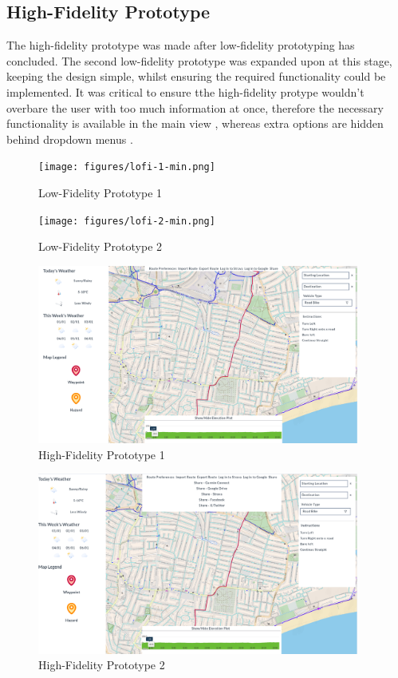 \subsection{High-Fidelity Prototype}
\label{ui:hi-fi}

The high-fidelity prototype was made after low-fidelity prototyping has concluded. The second low-fidelity prototype was expanded upon at this stage, keeping the design simple, whilst ensuring the required functionality could be implemented. It was critical to ensure tthe high-fidelity protype wouldn't overbare the user with too much information at once, therefore the necessary functionality is available in the main view , whereas extra options are hidden behind dropdown menus .

  \begin{figure}[!ht]
    \centering
    \texttt{[image: figures/lofi-1-min.png]}
    \caption{Low-Fidelity Prototype 1}
    \label{fig:lofi1}
  \end{figure}

  \begin{figure}[!ht]
    \centering
    \texttt{[image: figures/lofi-2-min.png]}
    \caption{Low-Fidelity Prototype 2}
    \label{fig:lofi2}
  \end{figure}

  \begin{figure}[!ht]
    \centering
    \includegraphics[width=400px]{figures/hifi-1.png}
    \caption{High-Fidelity Prototype 1}
    \label{fig:hifi1}
  \end{figure}

  \begin{figure}[!ht]
    \centering
    \includegraphics[width=400px]{figures/hifi-2.png}
    \caption{High-Fidelity Prototype 2}
    \label{fig:hifi2}
  \end{figure}

